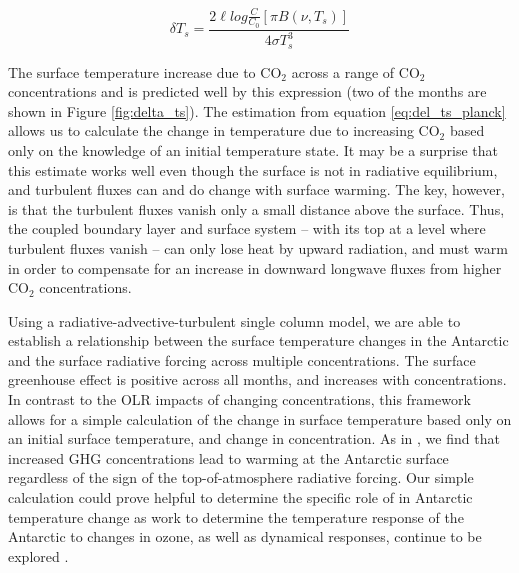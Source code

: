\documentclass[draft]{agujournal2019}
\begin{document}
\begin{equation}\label{eq:del_ts_planck}
    \delta T_s = \frac{2\ell log\frac{C}{C_0} [\pi B(\nu, T_s)]}{4\sigma T_s^3}
\end{equation}

The surface temperature increase due to CO$_2$ across a range of CO$_2$ concentrations and is predicted well by this expression (two of the months are shown in Figure \ref{fig:delta_ts}). The estimation from equation \ref{eq:del_ts_planck} allows us to calculate the change in temperature due to increasing CO$_2$ based only on the knowledge of an initial temperature state. It may be a surprise that this estimate works well even though the surface is not in radiative equilibrium, and turbulent fluxes can and do change with surface warming. The key, however, is that the turbulent fluxes vanish only a small distance above the surface. Thus, the coupled boundary layer and surface system -- with its top at a level where turbulent fluxes vanish -- can only lose heat by upward radiation, and must warm in order to compensate for an increase in downward longwave fluxes from higher CO$_2$ concentrations.  

Using a radiative-advective-turbulent single column model, we are able to establish a relationship between the surface temperature changes in the Antarctic and the surface radiative forcing across multiple  concentrations. The  surface greenhouse effect is positive across all months, and increases with  concentrations. In contrast to the OLR impacts of changing  concentrations, this framework allows for a simple calculation of the change in surface temperature based only on an initial surface temperature, and change in  concentration. As in , we find that increased GHG concentrations lead to warming at the Antarctic surface regardless of the sign of the top-of-atmosphere radiative forcing. Our simple calculation could prove helpful to determine the specific role of  in Antarctic temperature change as work to determine the temperature response of the Antarctic to changes in ozone, as well as dynamical responses, continue to be explored \cite{shindell_southern_2004, thompson_signatures_2011}.
\end{document}
